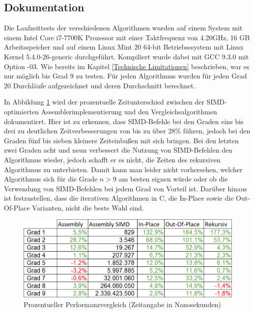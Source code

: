 \documentclass[course=asp]{aspdoc}
\begin{document}
\subsection{Dokumentation}

Die Laufzeittests der verschiedenen Algorithmen wurden auf einem System mit einem Intel Core i7-7700K Prozessor mit einer Taktfrequenz von 4.20GHz, 16 GB Arbeitsspeicher und auf einem Linux Mint 20 64-bit Betriebsssystem mit Linux Kernel 5.4.0-26-generic durchgef\"uhrt. Kompiliert wurde dabei mit GCC 9.3.0 mit Option -03.
Wie bereits im Kapitel \ref{Technische Limitationen} beschrieben, war es nur m\"oglich bis Grad 9 zu testen.
F\"ur jeden Algorithmus wurden f\"ur jeden Grad 20 Durchl\"aufe aufgezeichnet und deren Durchschnitt berechnet. 

In Abbildung \ref{Abb: Tabelle Performanz} wird der prozentuelle Zeitunterschied zwischen der SIMD-optimierten Assemblerimplementierung und den Vergleichsalgorithmen dokumentiert. Hier ist zu erkennen, dass SIMD-Befehle bei den Graden eins bis drei zu deutlichen Zeitverbesserungen von bis zu \"uber 28\% f\"uhren, jedoch bei den Graden f\"unf bis sieben kleinere Zeiteinbu\ss en mit sich bringen. Bei den letzten zwei Graden acht und neun verbessert die Nutzung von SIMD-Befehlen den Algorithmus wieder, jedoch schafft er es nicht, die Zeiten des rekursiven Algorithmus zu unterbieten.
Damit kann man leider nicht vorhersehen, welcher Algorithmus sich f\"ur die Grade $n > 9$ am besten eignen w\"urde oder ob die Verwendung von SIMD-Befehlen bei jedem Grad von Vorteil ist. Dar\"uber hinaus ist festzustellen, dass die iterativen Algorithmen in C, die In-Place sowie die Out-Of-Place Varianten, nicht die beste Wahl sind.

\begin{figure}[ht]
\centering
\includegraphics[scale = 0.53]{zeitmessungenProzent.png}
\caption{Prozentueller Performanzvergleich (Zeitangabe in Nanosekunden)} \label{Abb: Tabelle Performanz}
\captionsetup[figure]{font=small,labelfont=small}
\end{figure}
\end{document}
